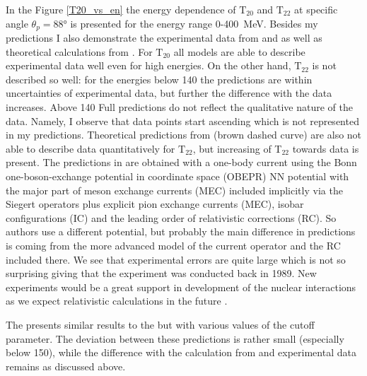     In the Figure \ref{T20_vs_en} the energy dependence of $\text{T}_{20}$ and $\text{T}_{22}$
    at specific angle $\theta_p = \ang{88}$
    is presented for the energy range 0-400~MeV. Besides my predictions I also demonstrate the experimental data from
    \cite{rachek2007} and \cite{mishev1993} as well as theoretical calculations from \cite{Schmitt1989}.
    For $\text{T}_{20}$ all models are able to describe experimental data well even for
    high energies. On the other hand, $\text{T}_{22}$ is not described so well: for the 
    energies below \SI{140}{\mev} the predictions are within uncertainties of experimental data,
    but further the difference with the data increases. Above \SI{140}{\mev}
    Full predictions do not  
    reflect the qualitative nature of the data. Namely, I observe that
    data points start ascending which is not represented in my predictions.
    Theoretical predictions from \cite{Schmitt1989} (brown dashed curve) are also not able
    to describe data quantitatively for $\text{T}_{22}$, but increasing of T$_{22}$
    towards data is present. The predictions in \cite{Schmitt1989}
    are obtained with a one-body current using the Bonn one-boson-exchange potential
    in coordinate space (OBEPR)
    NN potential with the major part of meson exchange
    currents (MEC) included implicitly via the Siegert operators plus explicit
    pion exchange currents (MEC), isobar configurations
    (IC) and the leading order of relativistic corrections
    (RC). So authors use a different potential, but
    probably the main difference in predictions is coming from the
    more advanced model of the current operator
    and the RC included there.
    We see that experimental errors are quite large which is not so surprising
    giving that the experiment was conducted back in 1989.
    New experiments would be a great support in development of the nuclear interactions
    as we expect relativistic calculations in the future \cite{Grassi2023}.

    The  presents similar results to the  but
    with various values of the cutoff parameter. The deviation between these
    predictions is rather small (especially below \SI{150}{\mev}), while the
    difference with the calculation from \cite{Schmitt1989} and experimental 
    data remains as discussed above.

